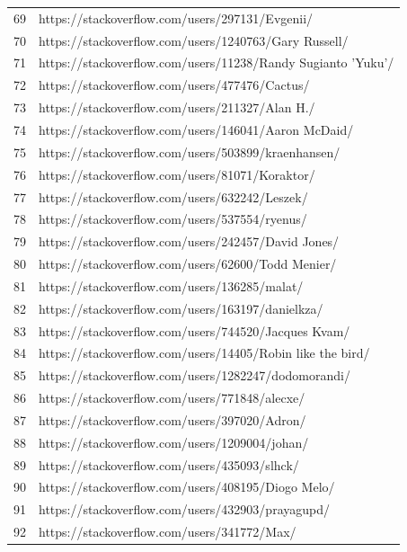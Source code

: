 \begin{center}
\begin{longtable}{|p{1.5cm}|p{12.5cm}|}
            69 & https://stackoverflow.com/users/297131/Evgenii/ \\
            70 & https://stackoverflow.com/users/1240763/Gary Russell/ \\
            71 & https://stackoverflow.com/users/11238/Randy Sugianto 'Yuku'/ \\
            72 & https://stackoverflow.com/users/477476/Cactus/ \\
            73 & https://stackoverflow.com/users/211327/Alan H./ \\
            74 & https://stackoverflow.com/users/146041/Aaron McDaid/ \\
            75 & https://stackoverflow.com/users/503899/kraenhansen/ \\
            76 & https://stackoverflow.com/users/81071/Koraktor/ \\
            77 & https://stackoverflow.com/users/632242/Leszek/ \\
            78 & https://stackoverflow.com/users/537554/ryenus/ \\
            79 & https://stackoverflow.com/users/242457/David Jones/ \\
            80 & https://stackoverflow.com/users/62600/Todd Menier/ \\
            81 & https://stackoverflow.com/users/136285/malat/ \\
            82 & https://stackoverflow.com/users/163197/danielkza/ \\
            83 & https://stackoverflow.com/users/744520/Jacques Kvam/ \\
            84 & https://stackoverflow.com/users/14405/Robin like the bird/ \\
            85 & https://stackoverflow.com/users/1282247/dodomorandi/ \\
            86 & https://stackoverflow.com/users/771848/alecxe/ \\
            87 & https://stackoverflow.com/users/397020/Adron/ \\
            88 & https://stackoverflow.com/users/1209004/johan/ \\
            89 & https://stackoverflow.com/users/435093/slhck/ \\
            90 & https://stackoverflow.com/users/408195/Diogo Melo/ \\
            91 & https://stackoverflow.com/users/432903/prayagupd/ \\
            92 & https://stackoverflow.com/users/341772/Max/ \\

\end{longtable}
\end{center}

